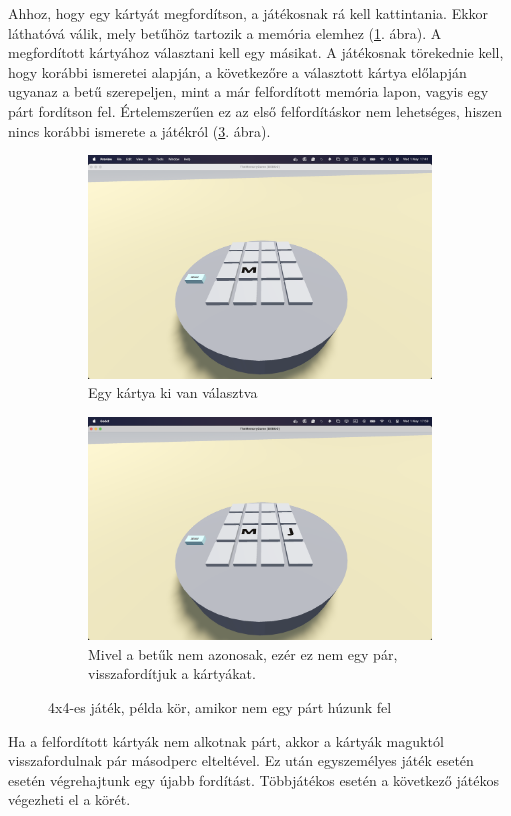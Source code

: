 Ahhoz, hogy egy kártyát megfordítson, a játékosnak rá kell kattintania. Ekkor láthatóvá válik, mely betűhöz tartozik a memória elemhez (\ref{img:kartya_fliped}. ábra). 
A megfordított kártyához választani kell egy másikat. A játékosnak törekednie kell, hogy korábbi ismeretei alapján, a következőre a választott kártya előlapján ugyanaz a betű szerepeljen, mint a már felfordított memória lapon, vagyis egy párt fordítson fel. 
Értelemszerűen ez az első felfordításkor nem lehetséges, hiszen nincs korábbi ismerete a játékról (\ref{img:non_pair}. ábra).
\begin{figure}[h]
\begin{subfigure}[t]{0.5\textwidth}
    \includegraphics[width=\linewidth]{img/asztal_4x4_card_flipped.png}
    \caption{Egy kártya ki van választva}
    \label{img:kartya_fliped}
\end{subfigure}
\begin{subfigure}[t]{0.5\textwidth}
    \includegraphics[width=\linewidth]{img/asztal_4x4_non_pair.png}
    \caption{Mivel a betűk nem azonosak, ezér ez nem egy pár, visszafordítjuk a kártyákat.}
    \label{img:non_pair}
\end{subfigure}
\caption{4x4-es játék, példa kör, amikor nem egy párt húzunk fel}
\end{figure}
Ha a felfordított kártyák nem alkotnak párt, akkor a kártyák maguktól visszafordulnak pár másodperc elteltével. Ez után egyszemélyes játék esetén esetén végrehajtunk egy újabb fordítást. Többjátékos esetén a következő játékos végezheti el a körét. 

